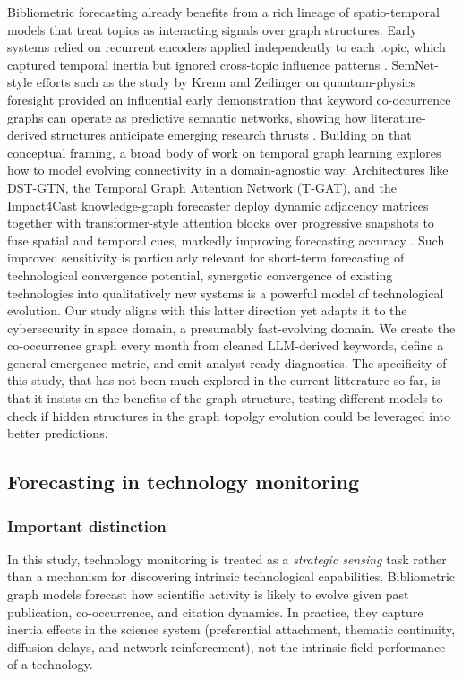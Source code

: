 \documentclass{article}
\begin{document}
Bibliometric forecasting already benefits from a rich lineage of spatio-temporal models that treat topics as interacting signals over graph structures.
Early systems relied on recurrent encoders applied independently to each topic, which captured temporal inertia but ignored cross-topic influence patterns \cite{he2019topicforecast,xu2020trendrnn}.
SemNet-style efforts such as the study by Krenn and Zeilinger on quantum-physics foresight provided an influential early demonstration that keyword co-occurrence graphs can operate as predictive semantic networks,
showing how literature-derived structures anticipate emerging research thrusts \cite{krenn2020predicting}.
Building on that conceptual framing, a broad body of work on temporal graph learning explores how to model evolving connectivity in a domain-agnostic way. Architectures like DST-GTN, the Temporal Graph Attention Network (T-GAT), and the Impact4Cast knowledge-graph forecaster deploy dynamic adjacency matrices together with transformer-style attention blocks over progressive snapshots to fuse spatial and temporal cues, markedly improving forecasting accuracy \cite{li2021dstgtn,zhao2023tgat,gu2024impact4cast}.
Such improved sensitivity is particularly relevant for short-term forecasting of technological convergence potential, synergetic convergence of existing technologies into qualitatively new systems is a powerful model of technological evolution.
Our study aligns with this latter direction yet adapts it to the cybersecurity in space domain, a presumably fast-evolving domain. We create the co-occurrence graph every month from cleaned LLM-derived keywords, define a general emergence metric, and emit analyst-ready diagnostics.
The specificity of this study, that has not been much explored in the current litterature so far, is that it insists on the benefits of the graph structure, testing different models to check if hidden structures in the graph topolgy evolution could be leveraged into better predictions.

\subsection{Forecasting in technology monitoring}

\subsubsection{Important distinction}

In this study, technology monitoring is treated as a \emph{strategic sensing} task rather than a mechanism for discovering intrinsic technological capabilities.
Bibliometric graph models forecast how scientific activity is likely to evolve given past publication, co-occurrence, and citation dynamics.
In practice, they capture inertia effects in the science system (preferential attachment, thematic continuity, diffusion delays, and network reinforcement), not the intrinsic field performance of a technology.
\end{document}
